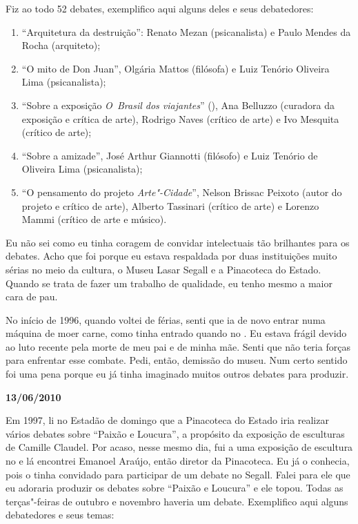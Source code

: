 Fiz ao todo 52 debates, exemplifico aqui alguns deles e seus
debatedores:

\begin{enumerate}
\item
  ``Arquitetura da destruição'': Renato Mezan (psicanalista) e Paulo
  Mendes da Rocha (arquiteto);
\item
  ``O mito de Don Juan'', Olgária Mattos (filósofa) e Luiz Tenório
  Oliveira Lima (psicanalista);
\item
  ``Sobre a exposição \emph{O~Brasil dos viajantes}'' (), Ana
  Belluzzo (curadora da exposição e crítica de arte), Rodrigo Naves
  (crítico de arte) e Ivo Mesquita (crítico de arte);
\item
  ``Sobre a amizade'', José Arthur Giannotti (filósofo) e Luiz Tenório
  de Oliveira Lima (psicanalista);
\item
  ``O pensamento do projeto \emph{Arte"-Cidade}'', Nelson Brissac Peixoto
  (autor do projeto e crítico de arte), Alberto Tassinari (crítico de
  arte) e Lorenzo Mammi (crítico de arte e músico).
\end{enumerate}
Eu não sei como eu tinha coragem de convidar intelectuais tão brilhantes
para os debates. Acho que foi porque eu estava respaldada por duas
instituições muito sérias no meio da cultura, o Museu Lasar Segall e a
Pinacoteca do Estado. Quando se trata de fazer um trabalho de qualidade,
eu tenho mesmo a maior cara de pau.

No início de 1996, quando voltei de férias, senti que ia de novo entrar
numa máquina de moer carne, como tinha entrado quando no . Eu estava
frágil devido ao luto recente pela morte de meu pai e de minha mãe.
Senti que não teria forças para enfrentar esse combate. Pedi, então,
demissão do museu. Num certo sentido foi uma pena porque eu já tinha
imaginado muitos outros debates para produzir.

\begin{center}\asterisc{}\end{center}


\begin{flushright}\textbf{13/06/2010}\end{flushright}


Em 1997, li no Estadão de domingo que a Pinacoteca do Estado iria
realizar vários debates sobre ``Paixão e Loucura'', a propósito da
exposição de esculturas de Camille Claudel. Por acaso, nesse mesmo dia,
fui a uma exposição de escultura no  e lá encontrei Emanoel Araújo,
então diretor da Pinacoteca. Eu já o conhecia, pois o tinha convidado
para participar de um debate no Segall. Falei para ele que eu adoraria
produzir os debates sobre ``Paixão e Loucura'' e ele topou. Todas as
terças"-feiras de outubro e novembro haveria um debate. Exemplifico aqui
alguns debatedores e seus temas:

